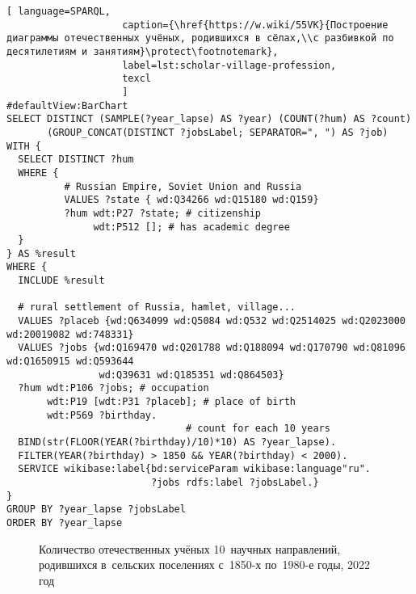 \newpage
\begin{lstlisting}[ language=SPARQL, 
                    caption={\href{https://w.wiki/55VK}{Построение диаграммы отечественных учёных, родившихся в сёлах,\\с разбивкой по десятилетиям и занятиям}\protect\footnotemark},
                    label=lst:scholar-village-profession,
                    texcl 
                    ]
#defaultView:BarChart
SELECT DISTINCT (SAMPLE(?year_lapse) AS ?year) (COUNT(?hum) AS ?count) 
       (GROUP_CONCAT(DISTINCT ?jobsLabel; SEPARATOR=", ") AS ?job) 
WITH {
  SELECT DISTINCT ?hum 
  WHERE {
          # Russian Empire, Soviet Union and Russia
          VALUES ?state { wd:Q34266 wd:Q15180 wd:Q159}
          ?hum wdt:P27 ?state; # citizenship
               wdt:P512 []; # has academic degree 
  }
} AS %result
WHERE {
  INCLUDE %result

  # rural settlement of Russia, hamlet, village...
  VALUES ?placeb {wd:Q634099 wd:Q5084 wd:Q532 wd:Q2514025 wd:Q2023000 wd:20019082 wd:748331}
  VALUES ?jobs {wd:Q169470 wd:Q201788 wd:Q188094 wd:Q170790 wd:Q81096 wd:Q1650915 wd:Q593644 
                wd:Q39631 wd:Q185351 wd:Q864503}
  ?hum wdt:P106 ?jobs; # occupation
       wdt:P19 [wdt:P31 ?placeb]; # place of birth
       wdt:P569 ?birthday.
                               # count for each 10 years
  BIND(str(FLOOR(YEAR(?birthday)/10)*10) AS ?year_lapse). 
  FILTER(YEAR(?birthday) > 1850 && YEAR(?birthday) < 2000).
  SERVICE wikibase:label{bd:serviceParam wikibase:language"ru".
                         ?jobs rdfs:label ?jobsLabel.}
}
GROUP BY ?year_lapse ?jobsLabel
ORDER BY ?year_lapse
\end{lstlisting}%


\newpage
\begin{figure*}
    \setlength{\fboxsep}{0pt}%
    \setlength{\fboxrule}{1pt}%
	\label{fig:scholars-village-color}
    \caption[Диаграмма количества учёных по родам деятельности, родившихся в сёлах, 2022 год.]
    {Количество отечественных учёных 10~научных направлений,
     родившихся в~сельских поселениях с~1850-х по~1980-е годы, 2022 год}%
%
\end{figure*} 



